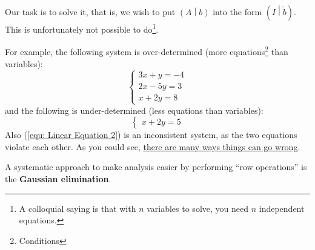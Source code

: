 \documentclass[12pt, a4paper]{article}
\theoremstyle{remark}
\theoremstyle{definition}
\numberwithin{equation}{section}
\numberwithin{definition}{section}
\numberwithin{example}{section}
\numberwithin{exercise}{section}
\numberwithin{remark}{section}
\numberwithin{figure}{section}
\begin{document}
Our task is to solve it, that is, we wish to put $\left( A \middle| b \right)$ into the form $\left( I \middle| \tilde b \right)$.
This is unfortunately not possible to do\footnote{
A colloquial saying is that with $n$ variables to solve, you need $n$ independent equations.}.

For example, the following system is over-determined (more equations\footnote{Conditions} than variables):
\begin{equation*}
    \begin{cases}
    3x + y = -4 \\
    2x - 5y = 3 \\
    x + 2y = 8
    \end{cases}
\end{equation*}
and the following is under-determined (less equations than variables):
\begin{equation*}
    \begin{cases}
        x + 2y = 5
    \end{cases}
\end{equation*}
Also (\ref{equ: Linear Equation 2}) is an inconsistent system, as the two equations violate each other.
As you could see, \underline{there are many ways things can go wrong}.

A systematic approach to make analysis easier by performing ``row operations'' is the \textbf{Gaussian elimination}.
\end{document}
